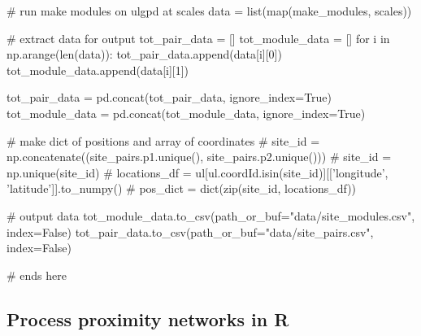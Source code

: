 \documentclass[]{article}
\newenvironment{Shaded}{}{}
\newcommand{\BuiltInTok}[1]{#1}
\newcommand{\CommentTok}[1]{\textcolor[rgb]{0.00,0.50,0.00}{#1}}
\newcommand{\ControlFlowTok}[1]{\textcolor[rgb]{0.00,0.00,1.00}{#1}}
\newcommand{\DecValTok}[1]{#1}
\newcommand{\KeywordTok}[1]{\textcolor[rgb]{0.00,0.00,1.00}{#1}}
\newcommand{\NormalTok}[1]{#1}
\newcommand{\OperatorTok}[1]{#1}
\newcommand{\StringTok}[1]{\textcolor[rgb]{0.00,0.50,0.50}{#1}}
\newcommand{\VariableTok}[1]{#1}
\begin{document}
\begin{Shaded}
\begin{Highlighting}[numbers=left,,]
\CommentTok{# run make modules on ulgpd at scales}
\NormalTok{data }\OperatorTok{=} \BuiltInTok{list}\NormalTok{(}\BuiltInTok{map}\NormalTok{(make_modules, scales))}

\CommentTok{# extract data for output}
\NormalTok{tot_pair_data }\OperatorTok{=}\NormalTok{ []}
\NormalTok{tot_module_data }\OperatorTok{=}\NormalTok{ []}
\ControlFlowTok{for}\NormalTok{ i }\KeywordTok{in}\NormalTok{ np.arange(}\BuiltInTok{len}\NormalTok{(data)):}
\NormalTok{    tot_pair_data.append(data[i][}\DecValTok{0}\NormalTok{])}
\NormalTok{    tot_module_data.append(data[i][}\DecValTok{1}\NormalTok{])}

\NormalTok{tot_pair_data }\OperatorTok{=}\NormalTok{ pd.concat(tot_pair_data, ignore_index}\OperatorTok{=}\VariableTok{True}\NormalTok{)}
\NormalTok{tot_module_data }\OperatorTok{=}\NormalTok{ pd.concat(tot_module_data, ignore_index}\OperatorTok{=}\VariableTok{True}\NormalTok{)}

\CommentTok{# make dict of positions and array of coordinates}
\CommentTok{# site_id = np.concatenate((site_pairs.p1.unique(), site_pairs.p2.unique()))}
\CommentTok{# site_id = np.unique(site_id)}
\CommentTok{# locations_df = ul[ul.coordId.isin(site_id)][['longitude', 'latitude']].to_numpy()}
\CommentTok{# pos_dict = dict(zip(site_id, locations_df))}

\CommentTok{# output data}
\NormalTok{tot_module_data.to_csv(path_or_buf}\OperatorTok{=}\StringTok{"data/site_modules.csv"}\NormalTok{, index}\OperatorTok{=}\VariableTok{False}\NormalTok{)}
\NormalTok{tot_pair_data.to_csv(path_or_buf}\OperatorTok{=}\StringTok{"data/site_pairs.csv"}\NormalTok{, index}\OperatorTok{=}\VariableTok{False}\NormalTok{)}

\CommentTok{# ends here}
\end{Highlighting}
\end{Shaded}

\hypertarget{process-proximity-networks-in-r}{%
\subsection{Process proximity networks in R}\label{process-proximity-networks-in-r}}
\end{document}
